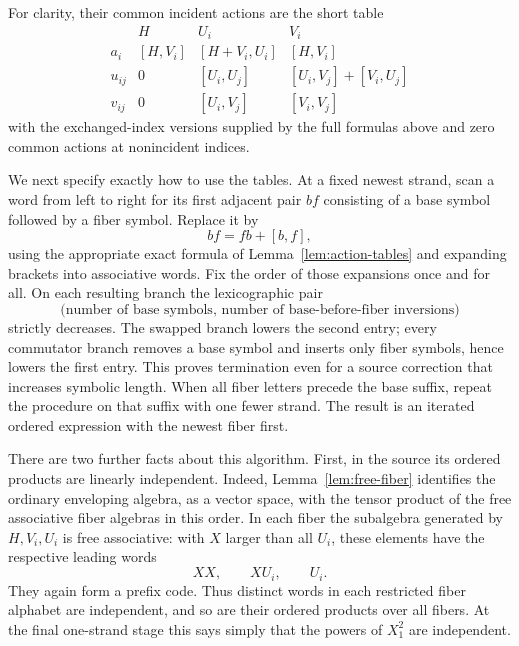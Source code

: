\documentclass[11pt]{article}
\theoremstyle{definition}
\theoremstyle{remark}
\numberwithin{equation}{section}
\begin{document}
For clarity, their common incident actions are the short table
\begin{equation}\label{eq:common-actions}
\begin{array}{c|ccc}
 &H&U_i&V_i\\ \hline
 a_i &[H,V_i]&[H+V_i,U_i]&[H,V_i]\\
 u_{ij}&0&[U_i,U_j]&[U_i,V_j]+[V_i,U_j]\\
 v_{ij}&0&[U_i,V_j]&[V_i,V_j]
\end{array}
\end{equation}
with the exchanged-index versions supplied by the full formulas
above and zero common actions at nonincident indices.

We next specify exactly how to use the tables.  At a fixed newest
strand, scan a word from left to right for its first adjacent pair
$bf$ consisting of a base symbol followed by a fiber symbol.  Replace
it by
\begin{equation}\label{eq:ordering-swap}
 bf=fb+[b,f],
\end{equation}
using the appropriate exact formula of
Lemma~\ref{lem:action-tables} and expanding brackets into associative
words.  Fix the order of those expansions once and for all.
On each resulting branch the lexicographic pair
\[
 \bigl(\text{number of base symbols},\,
        \text{number of base-before-fiber inversions}\bigr)
\]
strictly decreases.  The swapped branch lowers the second entry;
every commutator branch removes a base symbol and inserts only fiber
symbols, hence lowers the first entry.  This proves termination even
for a source correction that increases symbolic length.  When all
fiber letters precede the base suffix, repeat the procedure on that
suffix with one fewer strand.  The result is an iterated ordered
expression with the newest fiber first.

There are two further facts about this algorithm.  First, in the
source its ordered products are linearly independent.  Indeed,
Lemma~\ref{lem:free-fiber} identifies the ordinary enveloping algebra,
as a vector space, with the tensor product of the free associative
fiber algebras in this order.  In each fiber the subalgebra generated
by $H,V_i,U_i$ is free associative: with $X$ larger than all $U_i$,
these elements have the respective leading words
\[
 XX,\qquad XU_i,\qquad U_i.
\]
They again form a prefix code.  Thus distinct words in each restricted
fiber alphabet are independent, and so are their ordered products
over all fibers.  At the final one-strand stage this says simply
that the powers of $X_1^2$ are independent.
\end{document}
